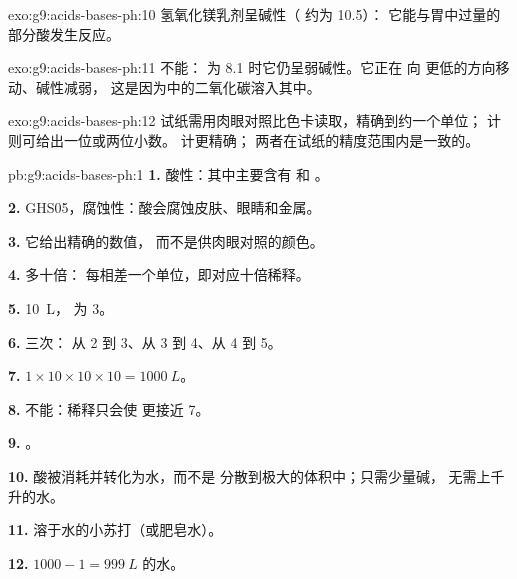 \begin{solution}{exo:g9:acids-bases-ph:10}
氢氧化镁乳剂呈碱性（ 约为 10.5）：
它能与胃中过量的部分酸发生反应。
\end{solution}

\begin{solution}{exo:g9:acids-bases-ph:11}
不能： 为 8.1 时它仍呈弱碱性。它正在
向  更低的方向移动、碱性减弱，
这是因为中的二氧化碳溶入其中。
\end{solution}

\begin{solution}{exo:g9:acids-bases-ph:12}
 试纸需用肉眼对照比色卡读取，精确到约一个单位；
 计则可给出一位或两位小数。 计更精确；
两者在试纸的精度范围内是一致的。
\end{solution}

\begin{solution}{pb:g9:acids-bases-ph:1}
\textbf{1.} 酸性：其中主要含有  和 
。

\textbf{2.} GHS05，腐蚀性：酸会腐蚀皮肤、眼睛和金属。

\textbf{3.} 它给出精确的数值，
而不是供肉眼对照的颜色。

\textbf{4.} 多十倍： 每相差一个单位，即对应十倍稀释。

\textbf{5.} \qty{10}{L}， 为 3。

\textbf{6.} 三次： 从 2 到 3、从 3 到 4、从 4 到 5。

\textbf{7.} $1 \times 10 \times 10 \times 10 = \qty{1000}{L}$。

\textbf{8.} 不能：稀释只会使  更接近 7。

\textbf{9.} 。

\textbf{10.} 酸被消耗并转化为水，而不是
分散到极大的体积中；只需少量碱，
无需上千升的水。

\textbf{11.} 溶于水的小苏打（或肥皂水）。

\textbf{12.} $1000 - 1 = \qty{999}{L}$ 的水。
\end{solution}
